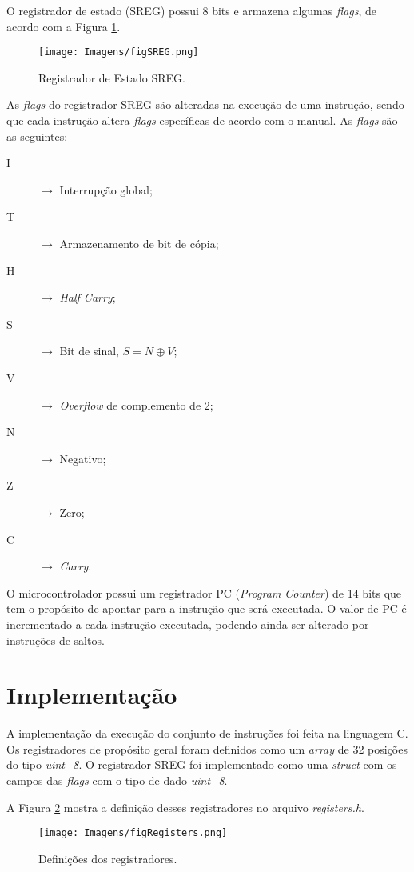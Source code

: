 \documentclass[12pt]{article}
\begin{document}
O registrador de estado (SREG) possui 8 bits e armazena algumas \textit{flags}, de acordo com a Figura \ref{figSREG}.

\begin{figure}[H]
  \centering
  \texttt{[image: Imagens/figSREG.png]}
  \caption{Registrador de Estado SREG.}
  \label{figSREG}
\end{figure}

As \textit{flags} do registrador SREG são alteradas na execução de uma instrução, sendo que cada instrução altera \textit{flags} específicas de acordo com o manual. As \textit{flags} são as seguintes:

\begin{description}
\item[I] $\rightarrow$ Interrupção global;
\item[T] $\rightarrow$ Armazenamento de bit de cópia;
\item[H] $\rightarrow$ \textit{Half Carry};
\item[S] $\rightarrow$ Bit de sinal, $ S = N \oplus V$; 
\item[V] $\rightarrow$ \textit{Overflow} de complemento de 2;
\item[N] $\rightarrow$ Negativo;
\item[Z] $\rightarrow$ Zero;
\item[C] $\rightarrow$ \textit{Carry}. 
\end{description}

O microcontrolador possui um registrador PC (\textit{Program Counter}) de 14 bits que tem o propósito de apontar para a instrução que será executada. O valor de PC é incrementado a cada instrução executada, podendo ainda ser alterado por instruções de saltos.

\section{Implementação}
A implementação da execução do conjunto de instruções foi feita na linguagem C. Os registradores de propósito geral foram definidos como um \textit{array} de 32 posições do tipo \textit{uint\_8}. O registrador SREG foi implementado como uma \textit{struct} com os campos das \textit{flags} com o tipo de dado \textit{uint\_8}.

A Figura \ref{figRegisters} mostra a definição desses registradores no arquivo \textit{registers.h}.

\begin{figure}[H]
  \centering
  \texttt{[image: Imagens/figRegisters.png]}
  \caption{Definições dos registradores.}
  \label{figRegisters}
\end{figure}
\end{document}
